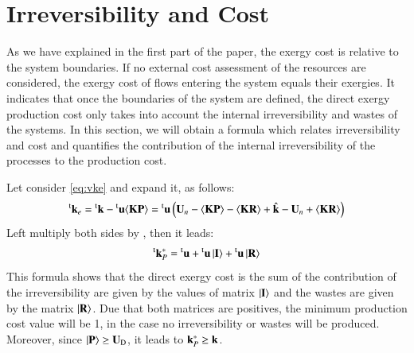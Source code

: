 \documentclass{ecos2018}
\begin{document}
\section{Irreversibility and Cost}
As we have explained in the first part of the paper, the exergy cost is relative to the system boundaries. If no external cost assessment of the resources are considered, the exergy cost of flows entering the system equals their exergies. It indicates that once the boundaries of the system are defined, the direct exergy production cost only takes into account the internal irreversibility and wastes of the systems. In this section, we will obtain a formula which relates irreversibility and cost and quantifies the contribution of the internal irreversibility of the processes to the production cost.

Let consider \cref{eq:vke} and expand it, as follows:
\begin{equation}
\prescript{\smash{\mathrm{t}}}{}{\mathbf{k}}_e=\prescript{\smash{\mathrm{t}}}{}{\mathbf{k}}-\prescript{\smash{\mathrm{t}}}{}{\mathbf{u}}\langle \textbf{KP} \rangle=\prescript{\smash{\mathrm{t}}}{}{\mathbf{u}}\left(\mathbf{U}_n-\langle \textbf{KP} \rangle-\langle \textbf{KR} \rangle+ \hat{\mathbf{k}}- \mathbf{U}_n + \langle \textbf{KR} \rangle\right)
\end{equation}
Left multiply both sides by , then it leads:
\begin{equation}
\label{eq:dicf}
\prescript{\smash{\mathrm{t}}}{}{\mathbf{k}}_P^*=\prescript{\smash{\mathrm{t}}}{}{\mathbf{u}} + \prescript{\smash{\mathrm{t}}}{}{\mathbf{u}}\left| {\textbf{I} } \right\rangle+\prescript{\smash{\mathrm{t}}}{}{\mathbf{u}}\left| {\textbf{R} } \right\rangle
\end{equation}
This formula shows that the direct exergy cost is the sum of the contribution of the irreversibility are given by the values of matrix $\left| {\textbf{I} } \right\rangle$ and the wastes are given by the matrix $\left| {\textbf{R} } \right\rangle$. Due that both matrices are positives, the minimum production cost value will be 1, in  the case no irreversibility or wastes will be produced. Moreover, since $\left| {\textbf{P} } \right\rangle\ge\mathbf{U}_\mathrm{D}$, it leads to $\mathbf{k}_P^*\ge\mathbf{k}$.
\end{document}
